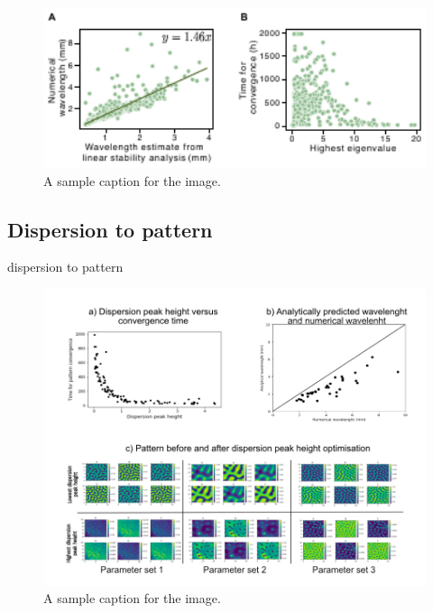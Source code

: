 \begin{figure}[h] %
    \centering
    \includegraphics[width=1\textwidth]{chapters/Chapter 1/dispersion_to_wavelength_convergence} %
    \caption{A sample caption for the image.}
    \label{fig:dispersion_to_wavelength_convergence} %
\end{figure}


\subsection{Dispersion to pattern}
dispersion to pattern
\begin{figure}[h] %
    \centering
    \includegraphics[width=1\textwidth]{chapters/Chapter 1/dispersion_to_shape} %
    \caption{A sample caption for the image.}
    \label{fig:dispersion_to_shape} %
\end{figure}



